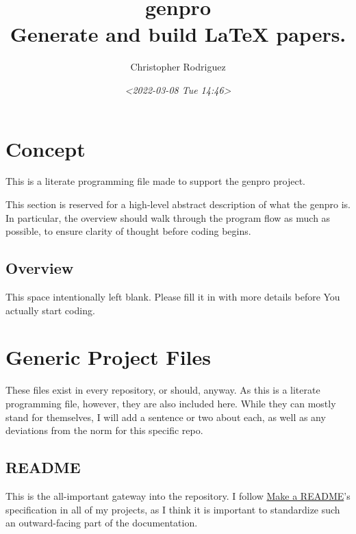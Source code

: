 \documentclass[11pt]{article}
\author{Christopher Rodriguez}
\date{\textit{<2022-03-08 Tue 14:46>}}
\title{genpro\\\medskip
\large Generate and build \LaTeX{} papers.}
\begin{document}
\maketitle
\tableofcontents

\section{Concept}
\label{sec:orga561c97}
This is a literate programming file made to support the genpro
project.

This section is reserved for a high-level abstract description of what the
genpro is. In particular, the overview should walk through the
program flow as much as possible, to ensure clarity of thought before coding
begins.
\subsection{Overview}
\label{sec:org9129c94}
This space intentionally left blank. Please fill it in with more details before
You actually start coding.

\section{Generic Project Files}
\label{sec:orgcba9d62}
These files exist in every repository, or should, anyway. As this is a literate
programming file, however, they are also included here. While they can mostly
stand for themselves, I will add a sentence or two about each, as well as any
deviations from the norm for this specific repo.

\subsection{README}
\label{sec:org1cf4cfc}
This is the all-important gateway into the repository. I follow \href{https://www.makeareadme.com/}{Make a README}'s
specification in all of my projects, as I think it is important to standardize
such an outward-facing part of the documentation.
\end{document}
